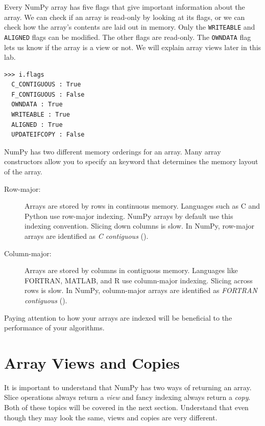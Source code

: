 Every NumPy array has five flags that give important information about the array.
We can check if an array is read-only by looking at its flags, or we can check how the array's contents are laid out in memory.
Only the \texttt{WRITEABLE} and \texttt{ALIGNED} flags can be modified.  The other flags are read-only.  
The \texttt{OWNDATA} flag lets us know if the array is a view or not.
We will explain array views later in this lab.
\begin{lstlisting}
>>> i.flags
  C_CONTIGUOUS : True
  F_CONTIGUOUS : False
  OWNDATA : True
  WRITEABLE : True
  ALIGNED : True
  UPDATEIFCOPY : False
\end{lstlisting}
NumPy has two different memory orderings for an array.
Many array constructors allow you to specify an  keyword that determines the memory layout of the array.
\begin{description}
\item[Row-major:] Arrays are stored by rows in continuous memory.
Languages such as C and Python use row-major indexing.  NumPy arrays by default use this indexing convention.
Slicing down columns is slow.  In NumPy, row-major arrays are identified as \emph{C contiguous} ().
\item[Column-major:] Arrays are stored by columns in contiguous memory.
Languages like FORTRAN, MATLAB, and R use column-major indexing.  Slicing across rows is slow.
In NumPy, column-major arrays are identified as \emph{FORTRAN contiguous} ().
\end{description}
Paying attention to how your arrays are indexed will be beneficial to the performance of your algorithms.
 

\section*{Array Views and Copies}
It is important to understand that NumPy has two ways of returning an array.
Slice operations always return a \emph{view} and fancy indexing always return a \emph{copy}.
Both of these topics will be covered in the next section.
Understand that even though they may look the same, views and copies are very different.

